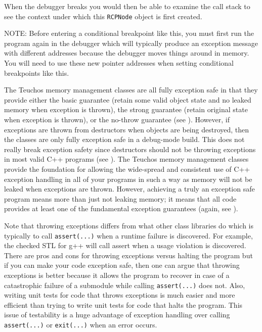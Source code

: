 \documentclass[pdf,ps2pdf,11pt]{SANDreport}
\begin{document}
When the debugger breaks you would then be able to examine the call
stack to see the context under which this {}\texttt{RCPNode} object is
first created.

NOTE: Before entering a conditional breakpoint like this, you must
first run the program again in the debugger which will typically
produce an exception message with different addresses because the
debugger moves things around in memory.  You will need to use these
new pointer addresses when setting conditional breakpoints like this.

The Teuchos memory management classes are all fully exception safe in
that they provide either the basic guarantee (retain some valid object
state and no leaked memory when exception is thrown), the strong
guarantee (retain original state when exception is thrown), or the
no-throw guarantee (see {}\cite[Item 71]{C++CodingStandards05}).
However, if exceptions are thrown from destructors when objects are
being destroyed, then the classes are only fully exception safe in a
debug-mode build.  This does not really break exception safety since
destructors should not be throwing exceptions in most valid C++
programs (see {}\cite[Item 51]{C++CodingStandards05}).  The Teuchos
memory management classes provide the foundation for allowing the
wide-spread and consistent use of C++ exception handling in all of
your programs in such a way as memory will not be leaked when
exceptions are thrown.  However, achieving a truly an exception safe
program means more than just not leaking memory; it means that all
code provides at least one of the fundamental exception guarantees
(again, see {}\cite[Item 71]{C++CodingStandards05}).

Note that throwing exceptions differs from what other class libraries
do which is typically to call {}\texttt{assert(...)} when a runtime
failure is discovered.  For example, the checked STL for g++ will call
assert when a usage violation is discovered.  There are pros and cons
for throwing exceptions versus halting the program but if you can make
your code exception safe, then one can argue that throwing exceptions
is better because it allows the program to recover in case of a
catastrophic failure of a submodule while calling
{}\texttt{assert(...)} does not.  Also, writing unit tests for code
that throws exceptions is much easier and more efficient than trying
to write unit tests for code that halts the program.  This issue of
testability is a huge advantage of exception handling over calling
{}\texttt{assert(...)} or {}\texttt{exit(...)} when an error occurs.
\end{document}
